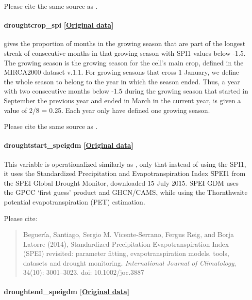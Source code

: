 \documentclass[]{book}
\begin{document}
Please cite the same source as .

\paragraph{droughtcrop\_spi
{[}\href{http://iridl.ldeo.columbia.edu/maproom/Global/Precipitation/SPI.html}{Original
data}{]}}\label{droughtcrop-spi}

gives the proportion of months in the growing season that are part of
the longest streak of consecutive months in that growing season with
SPI1 values below -1.5. The growing season is the growing season for the
cell's main crop, defined in the MIRCA2000 dataset v.1.1. For growing
seasons that cross 1 January, we define the whole season to belong to
the year in which the season ended. Thus, a year with two consecutive
months below -1.5 during the growing season that started in September
the previous year and ended in March in the current year, is given a
value of 2/8 = 0.25. Each year only have defined one growing season.

Please cite the same source as .

\paragraph{droughtstart\_speigdm
{[}\href{http://sac.csic.es/spei/map/maps.html}{Original
data}{]}}\label{droughtstart-speigdm}

This variable is operationalized similarly as
, only that instead of using the SPI1, it uses
the Standardized Precipitation and Evapotranspiration Index SPEI1 from
the SPEI Global Drought Monitor, downloaded 15 July 2015. SPEI GDM uses
the GPCC `first guess' product and GHCN/CAMS, while using the
Thornthwaite potential evapotranspiration (PET) estimation.

Please cite:

\begin{quote}
Beguería, Santiago, Sergio M. Vicente-Serrano, Fergus Reig, and Borja
Latorre (2014), Standardized Precipitation Evapotranspiration Index
(SPEI) revisited: parameter fitting, evapotranspiration models, tools,
datasets and drought monitoring. \emph{International Journal of
Climatology}, 34(10): 3001--3023. doi: 10.1002/joc.3887
\end{quote}

\paragraph{droughtend\_speigdm
{[}\href{http://sac.csic.es/spei/map/maps.html}{Original
data}{]}}\label{droughtend-speigdm}
\end{document}
